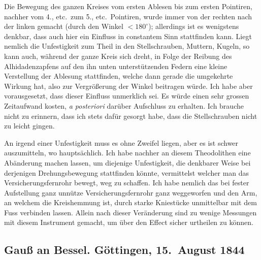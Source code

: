 \documentclass[12pt,a4paper]{article}
\theoremstyle{plain}
\theoremstyle{definition}
\theoremstyle{remark}
\begin{document}
Die Bewegung des ganzen Kreises vom ersten Ablesen bis zum ersten Pointiren, nachher vom 4., etc.\ zum 5., etc.\ Pointiren, wurde immer von der rechten nach der linken gemacht (durch den Winkel $< 180^{\circ}$); allerdings ist es wenigstens denkbar, dass auch hier ein Einfluss in constantem Sinn stattfinden kann. Liegt nemlich die Unfestigkeit zum Theil in den Stellschrauben, Muttern, Kugeln, so kann auch, w\"ahrend der ganze Kreis sich dreht, in Folge der Reibung des Alhidadenzapfens auf den ihn unten unterst\"utzenden Federn eine kleine Verstellung der Ablesung stattfinden, welche dann gerade die umgekehrte Wirkung hat, also zur Vergr\"o\ss erung der Winkel beitragen w\"urde. Ich habe aber vorausgesetzt, dass dieser Einfluss unmerklich sei. Es w\"urde einen sehr grossen Zeitaufwand kosten, \textit{a posteriori} dar\"uber Aufschluss zu erhalten. Ich brauche nicht zu erinnern, dass ich stets daf\"ur gesorgt habe, dass die Stellschrauben nicht zu leicht gingen.

An irgend einer Unfestigkeit muss es ohne Zweifel liegen, aber es ist schwer auszumitteln, wo haupts\"achlich. Ich habe nachher an diesem Theodolithen eine Ab\"anderung machen lassen, um diejenige Unfestigkeit, die denkbarer Weise bei derjenigen Drehungsbewegung stattfinden k\"onnte, vermittelst welcher man das Versicherungsfernrohr bewegt, weg zu schaffen. Ich habe nemlich das bei fester Aufstellung ganz unn\"utze Versicherungsfernrohr ganz weggeworfen und den Arm, an welchem die Kreishemmung ist, durch starke Kniest\"ucke unmittelbar mit dem Fuss verbinden lassen. Allein nach dieser Ver\"anderung sind zu wenige Messungen mit diesem Instrument gemacht, um \"uber den Effect sicher urtheilen zu k\"onnen.

\vfill
\eject

\subsection*{Gau\ss{} an Bessel. G\"ottingen, 15.\ August 1844}
\end{document}
